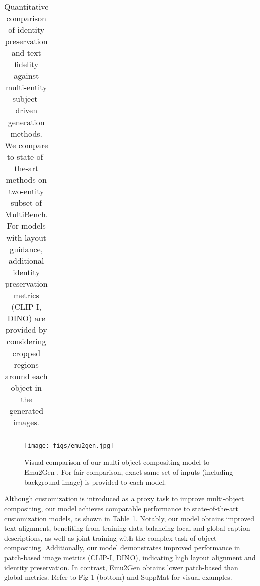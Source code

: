 \begin{table}[t!]
\begin{adjustbox}{width=\linewidth}
\begin{tabular}{lccccc}
\bottomrule
\end{tabular}
\end{adjustbox}

\caption{Quantitative comparison of identity preservation and text fidelity against multi-entity subject-driven generation methods. We compare to state-of-the-art methods on two-entity subset of MultiBench. For models with layout guidance, additional identity preservation metrics (CLIP-I, DINO) are provided by considering cropped regions around each object in the generated images.}
\label{tab:baselines2objcustomiz}
\vspace{-4mm}
\end{table}

\begin{figure}[t]
    \centering
    \texttt{[image: figs/emu2gen.jpg]}
    \caption{Visual comparison of our multi-object compositing model to Emu2Gen \cite{sun2024emugen}. For fair comparison, exact same set of inputs (including background image) is provided to each model. }

    \label{fig:baselineEmu}
    \vspace{-6mm}
\end{figure}

\noindent
Although customization is introduced as a proxy task to improve multi-object compositing, our model achieves comparable performance to state-of-the-art customization models, as shown in Table \ref{tab:baselines2objcustomiz}. Notably, our model obtains improved text alignment, benefiting from training data balancing local and global caption descriptions, as well as joint training with the complex task of object compositing. Additionally, our model demonstrates improved performance in patch-based image metrics (CLIP-I, DINO), indicating high layout alignment and identity preservation. In contrast, Emu2Gen obtains lower patch-based than global metrics. Refer to Fig 1 (bottom) and SuppMat for visual examples.




